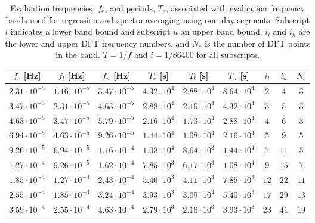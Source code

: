 \documentclass[draft,linenumbers]{agujournal2018}
\begin{document}
\begin{table}
  \caption{Evaluation frequencies, $f_e$, and periods, $T_e$, associated with evaluation frequency bands used for regression and spectra averaging using one--day segments. Subscript $l$ indicates a lower band bound and subscript $u$ an upper band bound. $i_l$ and $i_h$ are the lower and upper DFT frequency numbers, and $N_e$ is the number of DFT points in the band. $T=1/f$ and $i=1/86400$ for all subscripts.}
  \centering
  \small
\begin{tabular}{c c c c c c c c c}
\hline
$f_e$ [Hz] & $f_l$ [Hz] & $f_u$ [Hz] & $T_e$ [s] & $T_l$ [s] & $T_u$ [s] & $i_l$ & $i_u$ & $N_e$ \\
\hline
$2.31\cdot 10^{-5}$ & $1.16\cdot 10^{-5}$ & $3.47\cdot 10^{-5}$ & $4.32\cdot 10^{4}$ & $2.88\cdot 10^{4}$ & $8.64\cdot 10^{4}$ & $         2$ & $         4$ & $      3$\\
$3.47\cdot 10^{-5}$ & $2.31\cdot 10^{-5}$ & $4.63\cdot 10^{-5}$ & $2.88\cdot 10^{4}$ & $2.16\cdot 10^{4}$ & $4.32\cdot 10^{4}$ & $         3$ & $         5$ & $      3$\\
$4.63\cdot 10^{-5}$ & $3.47\cdot 10^{-5}$ & $5.79\cdot 10^{-5}$ & $2.16\cdot 10^{4}$ & $1.73\cdot 10^{4}$ & $2.88\cdot 10^{4}$ & $         4$ & $         6$ & $      3$\\
$6.94\cdot 10^{-5}$ & $4.63\cdot 10^{-5}$ & $9.26\cdot 10^{-5}$ & $1.44\cdot 10^{4}$ & $1.08\cdot 10^{4}$ & $2.16\cdot 10^{4}$ & $         5$ & $         9$ & $      5$\\
$9.26\cdot 10^{-5}$ & $6.94\cdot 10^{-5}$ & $1.16\cdot 10^{-4}$ & $1.08\cdot 10^{4}$ & $8.64\cdot 10^{3}$ & $1.44\cdot 10^{4}$ & $         7$ & $        11$ & $      5$\\
$1.27\cdot 10^{-4}$ & $9.26\cdot 10^{-5}$ & $1.62\cdot 10^{-4}$ & $7.85\cdot 10^{3}$ & $6.17\cdot 10^{3}$ & $1.08\cdot 10^{4}$ & $         9$ & $        15$ & $      7$\\
$1.85\cdot 10^{-4}$ & $1.27\cdot 10^{-4}$ & $2.43\cdot 10^{-4}$ & $5.40\cdot 10^{3}$ & $4.11\cdot 10^{3}$ & $7.85\cdot 10^{3}$ & $        12$ & $        22$ & $     11$\\
$2.55\cdot 10^{-4}$ & $1.85\cdot 10^{-4}$ & $3.24\cdot 10^{-4}$ & $3.93\cdot 10^{3}$ & $3.09\cdot 10^{3}$ & $5.40\cdot 10^{3}$ & $        17$ & $        29$ & $     13$\\
$3.59\cdot 10^{-4}$ & $2.55\cdot 10^{-4}$ & $4.63\cdot 10^{-4}$ & $2.79\cdot 10^{3}$ & $2.16\cdot 10^{3}$ & $3.93\cdot 10^{3}$ & $        23$ & $        41$ & $     19$\\

\end{tabular}
\end{table}
\end{document}
